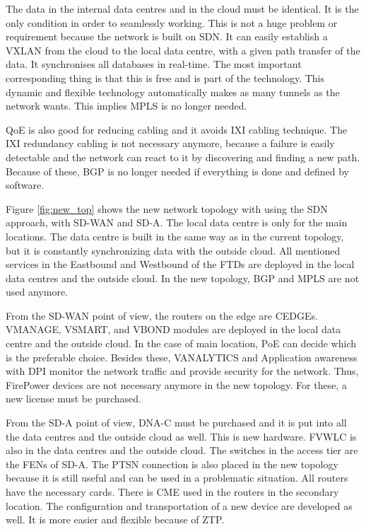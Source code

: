 \documentclass{article}
\begin{document}
The data in the internal data centres and in the cloud must be identical. It is the only condition in order to seamlessly working. This is not a huge problem or requirement because the network is built on SDN. It can easily establish a VXLAN from the cloud to the local data centre, with a given path transfer of the data. It synchronises all databases in real-time. The most important corresponding thing is that this is free and is part of the technology. This dynamic and flexible technology automatically makes as many tunnels as the network wants. This implies MPLS is no longer needed.

QoE is also good for reducing cabling and it avoids IXI cabling technique. The IXI redundancy cabling is not necessary anymore, because a failure is easily detectable and the network can react to it by discovering and finding a new path. Because of these, BGP is no longer needed if everything is done and defined by software.

Figure \ref{fig:new_top} shows the new network topology with using the SDN approach, with SD-WAN and SD-A. The local data centre is only for the main locations. The data centre is built in the same way as in the current topology, but it is constantly synchronizing data with the outside cloud. All mentioned services in the Eastbound and Westbound of the FTDs are deployed in the local data centres and the outside cloud. In the new topology, BGP and MPLS are not used anymore.

From the SD-WAN point of view, the routers on the edge are CEDGEs. VMANAGE, VSMART, and VBOND modules are deployed in the local data centre and the outside cloud. In the case of main location, PoE can decide which is the preferable choice. Besides these, VANALYTICS and Application awareness with DPI monitor the network traffic and provide security for the network. Thus, FirePower devices are not necessary anymore in the new topology. For these, a new license must be purchased.

From the SD-A point of view, DNA-C must be purchased and it is put into all the data centres and the outside cloud as well. This is new hardware. FVWLC is also in the data centres and the outside cloud. The switches in the access tier are the FENs of SD-A. The PTSN connection is also placed in the new topology because it is still useful and can be used in a problematic situation. All routers have the necessary cards. There is CME used in the routers in the secondary location. The configuration and transportation of a new device are developed as well. It is more easier and flexible because of ZTP.
\end{document}
